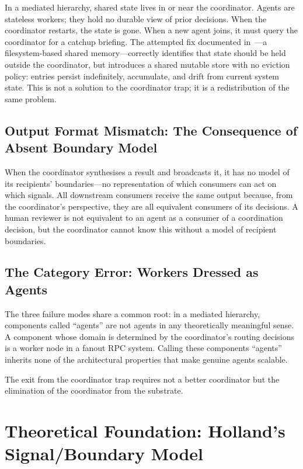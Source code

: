 \documentclass[11pt]{article}
\begin{document}
In a mediated hierarchy, shared state lives in or near the coordinator. Agents are
stateless workers; they hold no durable view of prior decisions. When the
coordinator restarts, the state is gone. When a new agent joins, it must query the
coordinator for a catchup briefing. The attempted fix documented
in~\cite{context-problem}---a filesystem-based shared memory---correctly identifies
that state should be held outside the coordinator, but introduces a shared mutable
store with no eviction policy: entries persist indefinitely, accumulate, and drift
from current system state. This is not a solution to the coordinator trap; it is a
redistribution of the same problem.

\subsection{Output Format Mismatch: The Consequence of Absent Boundary Model}

When the coordinator synthesises a result and broadcasts it, it has no model of
its recipients' boundaries---no representation of which consumers can act on which
signals. All downstream consumers receive the same output because, from the
coordinator's perspective, they are all equivalent consumers of its decisions. A
human reviewer is not equivalent to an agent as a consumer of a coordination
decision, but the coordinator cannot know this without a model of recipient
boundaries.

\subsection{The Category Error: Workers Dressed as Agents}

The three failure modes share a common root: in a mediated hierarchy, components
called ``agents'' are not agents in any theoretically meaningful sense. A component
whose domain is determined by the coordinator's routing decisions is a worker node
in a fanout RPC system. Calling these components ``agents'' inherits none of the
architectural properties that make genuine agents scalable.

The exit from the coordinator trap requires not a better coordinator but the
elimination of the coordinator from the substrate.

\section{Theoretical Foundation: Holland's Signal/Boundary Model}
\end{document}
